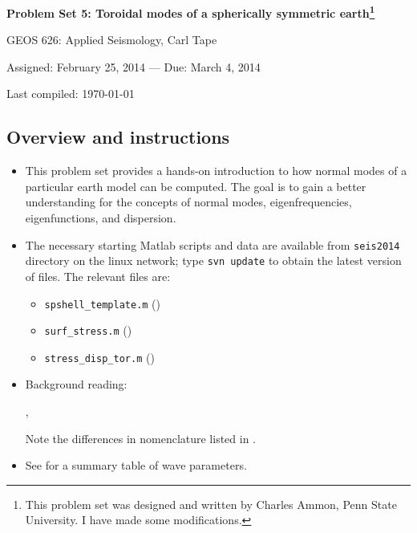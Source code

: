 \documentclass[11pt,titlepage,fleqn]{article}
\begin{document}

\begin{center}

{\large \bf Problem Set 5: Toroidal modes of a spherically symmetric earth\footnote{This problem set was designed and written by Charles Ammon, Penn State University. I have made some modifications.}}

GEOS 626: Applied Seismology, Carl Tape

Assigned: February 25, 2014 --- Due: March 4, 2014

Last compiled: \today

\end{center}


\subsection*{Overview and instructions}

\begin{itemize}
\item This problem set provides a hands-on introduction to how normal modes of a particular earth model can be computed. The goal is to gain a better understanding for the concepts of normal modes, eigenfrequencies, eigenfunctions, and dispersion.

\item The necessary starting Matlab scripts and data are available from \verb+seis2014+ directory on the linux network; type \verb+svn update+ to obtain the latest version of files. The relevant files are:
%
\begin{itemize}
\item \verb+spshell_template.m+ ()
\item \verb+surf_stress.m+ ()
\item \verb+stress_disp_tor.m+ ()
\end{itemize}

\item Background reading:

\citet[][Section 2.9]{SteinWysession}, \citet[][Ch.~8]{DT}

Note the differences in nomenclature listed in .

\item See  for a summary table of wave parameters.

\end{itemize}
\end{document}

